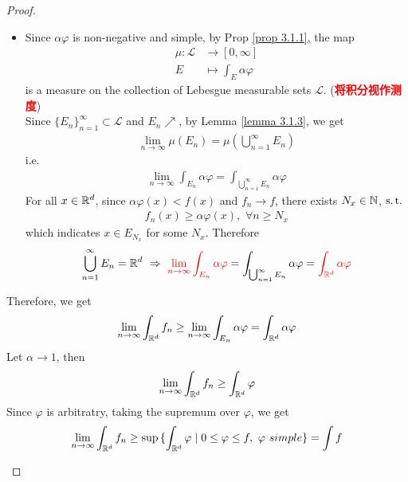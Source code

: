 \begin{thm}
\begin{proof}
\begin{itemize}
				\vspace{2em}
				\begin{itemize}
					\item Since $\alpha \varphi$ is non-negative and simple, by Prop \ref{prop 3.1.1}, the map
					\begin{align}
						\mu : \mathcal{L} &\longrightarrow [0 , \infty] \\
						E &\longmapsto \int_{E}{\alpha \varphi}
					\end{align}
					is a measure on the collection of Lebesgue measurable sets $\mathcal{L}$. (\textcolor{red}{\textbf{将积分视作测度}}) \\
					Since $\{ E_n \}_{n = 1}^{\infty} \subset \mathcal{L}$ and $E_n \nearrow$, by Lemma \ref{lemma 3.1.3}, we get
					\begin{align}
						\lim_{n \to \infty}{\mu(E_n)} = \mu(\bigcup_{n = 1}^{\infty}{E_n})
					\end{align}
					i.e.
					\begin{align}
						\lim_{n \to \infty}{\int_{E_n}{\alpha \varphi}} = \int_{\bigcup_{n = 1}^{\infty}{E_n}}{\alpha \varphi}
					\end{align}
					For all $x \in \mathbb{R}^d$, since $\alpha \varphi(x) < f(x)$ and $f_n \to f$, there exists $N_x \in \mathbb{N}$, $\operatorname{s.t.}$
					\begin{align}
						f_{n}(x) \geq \alpha \varphi(x) , \,\, \forall n \geq N_x
					\end{align}
					which indicates $x \in E_{N_x}$ for some $N_x$. Therefore
					\begin{align}
						\bigcup_{n = 1}^{\infty}{E_n} = \mathbb{R}^d \,\, \Rightarrow \,\, 
						\textcolor{red}{\lim_{n \to \infty}{\int_{E_n}{\alpha \varphi}}} 
						= \int_{\bigcup_{n = 1}^{\infty}{E_n}}{\alpha \varphi} 
						= \textcolor{red}{\int_{\mathbb{R}^d}{\alpha \varphi}}
					\end{align}
				\end{itemize}
			
				\vspace{2em}
				Therefore, we get
				\begin{align}
					\lim_{n \to \infty}{\int_{\mathbb{R}^d}{f_n}} 
					\geq \lim_{n \to \infty}{\int_{E_n}{\alpha \varphi}} 
					= \int_{\mathbb{R}^d}{\alpha \varphi}
				\end{align}
				Let $\alpha \to 1$, then
				\begin{align}
					\lim_{n \to \infty}{\int_{\mathbb{R}^d}{f_n}} 
					\geq \int_{\mathbb{R}^d}{\varphi}
				\end{align}
				Since $\varphi$ is arbitratry, taking the supremum over $\varphi$, we get
				\begin{align}
					\lim_{n \to \infty}{\int_{\mathbb{R}^d}{f_n}} 
					\geq \sup{\{ \int_{\mathbb{R}^d}{\varphi} \mid 0 \leq \varphi \leq f , \,\, \varphi \,\, simple \}}
					= \int{f}
				\end{align}
			\end{itemize}
		\end{proof}
	\end{thm}

